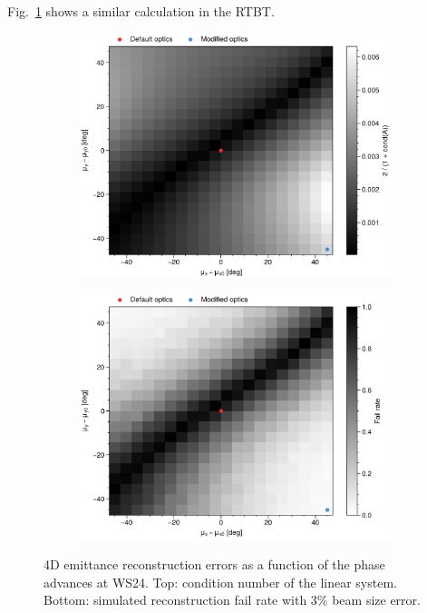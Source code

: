 Fig.~\ref{fig:rtbt_condition_number} shows a similar calculation in the RTBT. 
%
\begin{figure}[!p]
    \centering
    \begin{subfigure}{0.75\textwidth}
        \includegraphics[width=1.0\textwidth]{Images/chapter4/rtbt_condition_number.png}
    \end{subfigure}
    \vfill
    \vspace*{0.8cm}
    \begin{subfigure}{0.75\textwidth}
        \includegraphics[width=1.0\textwidth]{Images/chapter4/rtbt_fail_rate.png}
    \end{subfigure}
    \caption{4D emittance reconstruction errors as a function of the phase advances at WS24. Top: condition number of the linear system. Bottom: simulated reconstruction fail rate with 3\% beam size error.}
    \label{fig:rtbt_condition_number}
\end{figure}
